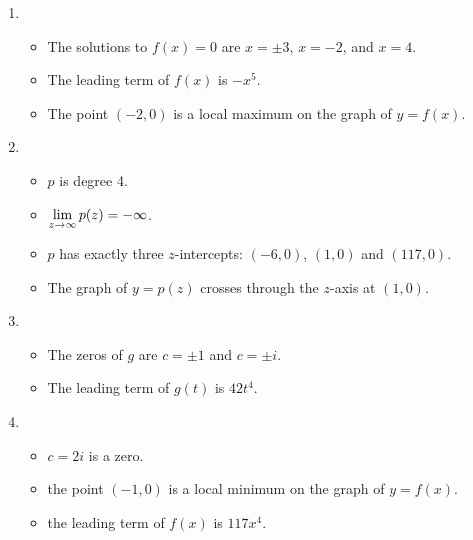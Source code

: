 \begin{enumerate}
\begin{itemize}
\end{itemize}

\enlargethispage{0.25in}

\item

\begin{itemize}

\item The solutions to $f(x) =0$ are $x = \pm 3$, $x=-2$, and $x=4$.
\item The leading term of $f(x)$ is $-x^5$.
\item The point $(-2, 0)$ is a local maximum on the graph of $y=f(x)$.

\end{itemize}

\item 

\begin{itemize}

\item $p$ is degree 4.
\item $\displaystyle{\lim_{z \rightarrow \infty} p(z) =  -\infty}$.
\item $p$ has exactly three $z$-intercepts:  $(-6,0)$, $(1,0)$ and $(117,0)$.
\item  The graph of $y=p(z)$ crosses through the $z$-axis at $(1,0)$.

\end{itemize}



\item

\begin{itemize}

\item The zeros of $g$ are $c=\pm 1$ and $c = \pm i$.
\item The leading term of $g(t)$ is $42t^4$.

\end{itemize}


\item

\begin{itemize}

\item $c=2i$ is a zero.
\item the point $(-1,0)$ is a local minimum on the graph of $y=f(x)$.
\item the leading term of $f(x)$ is $117x^4$.

\end{itemize}



\end{enumerate}
